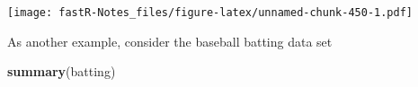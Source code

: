 \documentclass[]{book}
\newenvironment{Shaded}{\begin{snugshade}}{\end{snugshade}}
\newcommand{\KeywordTok}[1]{\textcolor[rgb]{0.13,0.29,0.53}{\textbf{#1}}}
\newcommand{\DataTypeTok}[1]{\textcolor[rgb]{0.13,0.29,0.53}{#1}}
\newcommand{\OperatorTok}[1]{\textcolor[rgb]{0.81,0.36,0.00}{\textbf{#1}}}
\newcommand{\NormalTok}[1]{#1}
\theoremstyle{definition}
\theoremstyle{definition}
\theoremstyle{definition}
\theoremstyle{remark}
\begin{document}
\begin{Shaded}
\end{Shaded}

\texttt{[image: fastR-Notes\_files/figure-latex/unnamed-chunk-450-1.pdf]}

As another example, consider the baseball batting data set

\begin{Shaded}
\begin{Highlighting}[]
\KeywordTok{summary}\NormalTok{(batting)}
\end{Highlighting}
\end{Shaded}
\end{document}
